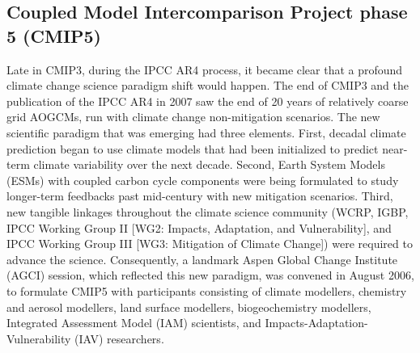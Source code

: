 \documentclass[manuscript]{copernicus}
\newcommand{\mycomment}[1]{}
\begin{document}
\mycomment{
Old text
While no formal phase was identified CMIP4, some CMIP3 follow-on simulations focused on climate change detection and attribution, specifically single-forcing experiments that held all but one of the 20C3M forcings fixed, were undertaken by several modelling groups. However, these were never formally contributed to a managed multi-model CMIP archive \citep{stouffer_cmip5_2017}. The early effort was a precursor to the CMIP6 Detection and Attribution Model Intercomparison Project \citep[DAMIP;][]{gillett_detection_2016}, building off early work focused on resolving the regional patterns of greenhouse gas and sulphate aerosol forcing \citep{taylor_response_1994, santer_towards_1995, hegerl_optimal_2000, gillett_detecting_2002, hegerl_20c3m_2003}. As planning began for the experiments targeting the next IPCC Fifth Assessment (AR5), aligning the CMIP and the IPCC report phases was an additional motivation to skip the CMIP4 identifier. This additionally also avoided unnecessary confusion with the developing coordinated carbon-cycle modelling activities, with the Coupled Climate-Carbon Cycle Model Intercomparison Project (C4MIP) an active collaborative project of the WGCM and the IGBP that had been running in parallel to the prior CMIP phases \citep[e.g.,][]{fung_full-form_2000, cox_modelling_2002, friedlingstein_climatecarbon_2006}. C4MIP was one of numerous parallel efforts leveraging the science coordination nurtured by the growing MIP community.
CMIP4 comment - https://www.wcrp-climate.org/images/modelling/WGCM/WGCM17/WGCM17_report.pdf#Page=8
}


\subsection{Coupled Model Intercomparison Project phase 5 (CMIP5)}
\label{sec:cmip5ProjectDesign}

Late in CMIP3, during the IPCC AR4 process, it became clear that a profound climate change science paradigm shift would happen. The end of CMIP3 and the publication of the IPCC AR4 in 2007 saw the end of 20 years of relatively coarse grid AOGCMs, run with climate change non-mitigation scenarios. The new scientific paradigm that was emerging had three elements. First, decadal climate prediction began to use climate models that had been initialized to predict near-term climate variability over the next decade. Second, Earth System Models (ESMs) with coupled carbon cycle components were being formulated to study longer-term feedbacks past mid-century with new mitigation scenarios. Third, new tangible linkages throughout the climate science community (WCRP, IGBP, IPCC Working Group II [WG2: Impacts, Adaptation, and Vulnerability], and IPCC Working Group III [WG3: Mitigation of Climate Change]) were required to advance the science. Consequently, a landmark Aspen Global Change Institute (AGCI) session, which reflected this new paradigm, was convened in August 2006, to formulate CMIP5 with participants consisting of climate modellers, chemistry and aerosol modellers, land surface modellers, biogeochemistry modellers, Integrated Assessment Model (IAM) scientists, and Impacts-Adaptation-Vulnerability (IAV) researchers.
\end{document}
